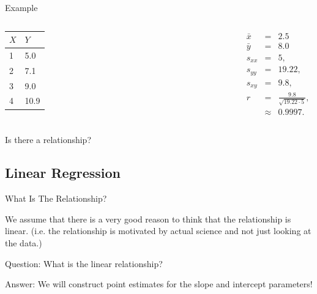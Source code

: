 \begin{frame}{Example}

    \begin{columns}

      \begin{tabular}{l|l}
        $X$ & $Y$ \\ \hline
        1 & 5.0 \\
        2 & 7.1  \\
        3 & 9.0 \\
        4 & 10.9
      \end{tabular}


      \begin{eqnarray*}
        \bar{x} & = & 2.5 \\
        \bar{y} & = & 8.0 \\
        s_{xx} & = & 5, \\
        s_{yy} & = & 19.22, \\
        s_{xy} & = & 9.8, \\
        r & = & \frac{9.8}{\sqrt{19.22 \cdot 5}}, \\
        & \approx & 0.9997.  
      \end{eqnarray*}

      \end{columns}


      Is there a  relationship?

  
\end{frame}


\subsection{Linear Regression}

\begin{frame}{What Is The Relationship?}

  We assume that there is a very good reason to think that the relationship is linear. 
  (i.e. the relationship is motivated by actual science and not just looking at the 
  data.)

  \vfill

  Question: What is the linear relationship?

  Answer: We will construct point estimates for the slope and intercept parameters!

  \vfill
  
\end{frame}


